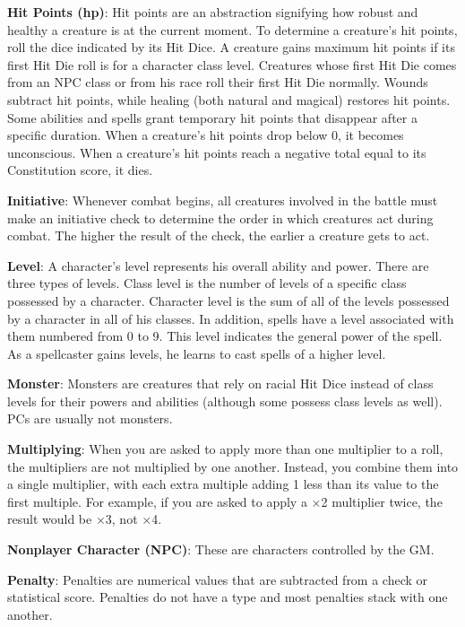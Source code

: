 \textbf{Hit Points (hp)}: Hit points are an abstraction signifying how robust and healthy a creature is at the current moment. To determine a creature's hit points, roll the dice indicated by its Hit Dice. A creature gains maximum hit points if its first Hit Die roll is for a character class level. Creatures whose first Hit Die comes from an NPC class or from his race roll their first Hit Die normally. Wounds subtract hit points, while healing (both natural and magical) restores hit points. Some abilities and spells grant temporary hit points that disappear after a specific duration. When a creature's hit points drop below 0, it becomes unconscious. When a creature's hit points reach a negative total equal to its Constitution score, it dies.
				
\textbf{Initiative}: Whenever combat begins, all creatures involved in the battle must make an initiative check to determine the order in which creatures act during combat. The higher the result of the check, the earlier a creature gets to act.
				
\textbf{Level}: A character's level represents his overall ability and power. There are three types of levels. Class level is the number of levels of a specific class possessed by a character. Character level is the sum of all of the levels possessed by a character in all of his classes. In addition, spells have a level associated with them numbered from 0 to 9. This level indicates the general power of the spell. As a spellcaster gains levels, he learns to cast spells of a higher level.
				
\textbf{Monster}: Monsters are creatures that rely on racial Hit Dice instead of class levels for their powers and abilities (although some possess class levels as well). PCs are usually not monsters.
				
\textbf{Multiplying}: When you are asked to apply more than one multiplier to a roll, the multipliers are not multiplied by one another. Instead, you combine them into a single multiplier, with each extra multiple adding 1 less than its value to the first multiple. For example, if you are asked to apply a \mbox{$\times$}2 multiplier twice, the result would be \mbox{$\times$}3, not \mbox{$\times$}4.
				
\textbf{Nonplayer Character (NPC)}: These are characters controlled by the GM.
				
\textbf{Penalty}: Penalties are numerical values that are subtracted from a check or statistical score. Penalties do not have a type and most penalties stack with one another.
				
